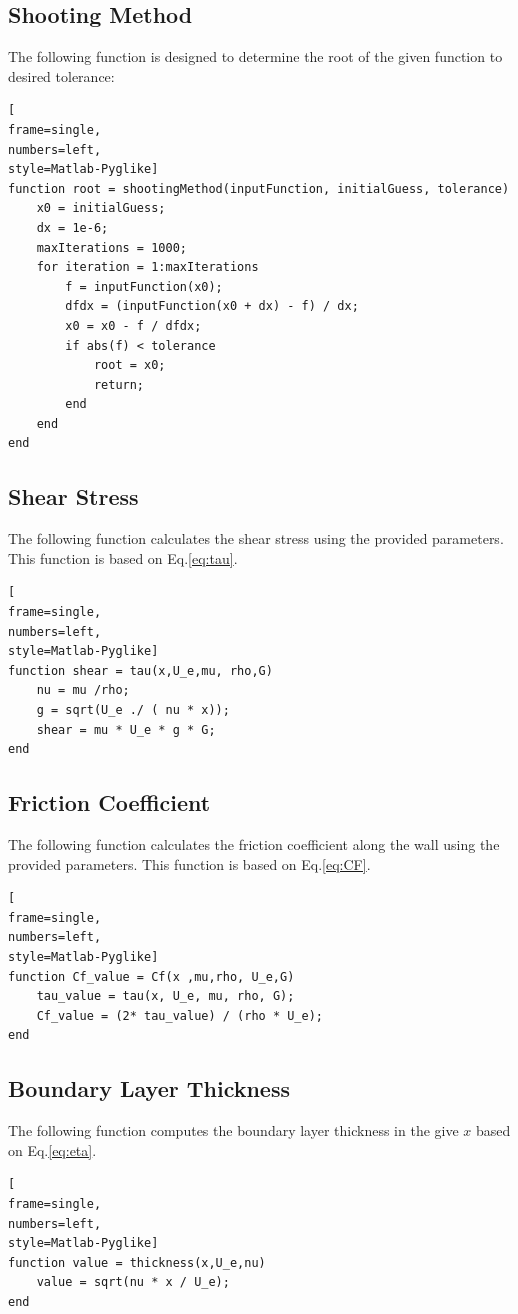 \documentclass[]{report}
\begin{document}
\subsection{Shooting Method}
\label{{func:shoot}}

The following function is designed to determine the root of the given function to desired tolerance:
\begin{lstlisting}[
frame=single,
numbers=left,
style=Matlab-Pyglike]
function root = shootingMethod(inputFunction, initialGuess, tolerance)
    x0 = initialGuess;
    dx = 1e-6;
    maxIterations = 1000;
    for iteration = 1:maxIterations
        f = inputFunction(x0);
        dfdx = (inputFunction(x0 + dx) - f) / dx;
        x0 = x0 - f / dfdx;
        if abs(f) < tolerance
            root = x0;
            return;
        end
    end
end
\end{lstlisting}

\subsection{Shear Stress}
\label{func:tau}
The following function  calculates the shear stress using the provided parameters. This function is based on Eq.\ref{eq:tau}.

\begin{lstlisting}[
frame=single,
numbers=left,
style=Matlab-Pyglike]
function shear = tau(x,U_e,mu, rho,G)
    nu = mu /rho;
    g = sqrt(U_e ./ ( nu * x));
    shear = mu * U_e * g * G;
end
\end{lstlisting}

\subsection{Friction Coefficient}
\label{func:CF}
The following function  calculates the friction coefficient along the wall using the provided parameters. This function is based on Eq.\ref{eq:CF}.

\begin{lstlisting}[
frame=single,
numbers=left,
style=Matlab-Pyglike]
function Cf_value = Cf(x ,mu,rho, U_e,G)
    tau_value = tau(x, U_e, mu, rho, G);
    Cf_value = (2* tau_value) / (rho * U_e);
end
\end{lstlisting}

\subsection{Boundary Layer Thickness}
The following function computes the boundary layer thickness in the give $x$ based on Eq.\ref{eq:eta}.
\begin{lstlisting}[
frame=single,
numbers=left,
style=Matlab-Pyglike]
function value = thickness(x,U_e,nu)
    value = sqrt(nu * x / U_e);
end
\end{lstlisting}
\end{document}

